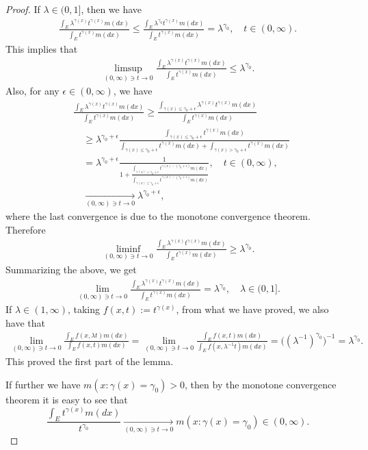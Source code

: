 \documentclass[UTF8]{pkuthss}
\theoremstyle{plain}
\theoremstyle{definition}
\numberwithin{equation}{section}
\begin{document}
\begin{proof}
	If $\lambda \in (0,1]$, then we have
\begin{align}
	\frac{\int_E \lambda^{\gamma(x)} t^{\gamma(x)} m(dx)}{\int_E t^{\gamma(x)} m(dx)}
	\leq \frac{\int_E \lambda^{\gamma_0} t^{\gamma(x)} m(dx)}{\int_E t^{\gamma(x)} m(dx)}
	= \lambda^{\gamma_0},
	\quad t\in (0,\infty).
\end{align}
	This implies that
\begin{align}
	\limsup_{(0,\infty) \ni t\to 0}\frac{\int_E \lambda^{\gamma(x)} t^{\gamma(x)} m(dx)}{\int_E t^{\gamma(x)} m(dx)}	
	\leq \lambda ^{\gamma_0}.
\end{align}
	Also, for any $\epsilon \in (0,\infty)$, we have
\begin{align}
	&\frac{\int_E \lambda^{\gamma(x)} t^{\gamma(x)} m(dx)}{\int_E t^{\gamma(x)} m(dx)}
	\geq \frac{ \int_{ \gamma(x) \leq  \gamma_0 + \epsilon } \lambda^{ \gamma(x) } t^{ \gamma(x)} m(dx) } { \int_E t^{ \gamma(x) } m(dx) }
	\\&\quad \geq \lambda^{ \gamma_0 + \epsilon} \frac{ \int_{ \gamma(x) \leq \gamma_0 + \epsilon } t^{ \gamma(x)} m(dx) } { \int_{ \gamma(x) \leq \gamma_0 + \epsilon}t^{\gamma(x)}m(dx)+ \int_{\gamma(x) > \gamma_0 + \epsilon} t^{\gamma(x)}m(dx)}
	\\&\quad = \lambda^{\gamma_0 + \epsilon} \frac{1}{1+ \frac{\int_{\gamma(x) > \gamma_0 + \epsilon}t^{\gamma(x) - (\gamma_0 + \epsilon)}m(dx)}{\int_{\gamma(x) \leq \gamma_0 + \epsilon}t^{\gamma(x)- (\gamma_0 + \epsilon)}m(dx)}},
	\quad t\in (0, \infty),
	\\&\quad \xrightarrow[(0,\infty) \ni t\to 0]{}
	\lambda ^{\gamma_0 + \epsilon},
\end{align}
	where the last convergence is due to the monotone convergence theorem.
	Therefore
\begin{align}
	\liminf_{(0,\infty) \ni t\to 0}\frac{\int_E \lambda^{\gamma(x)} t^{\gamma(x)} m(dx)}{\int_E t^{\gamma(x)} m(dx)}
	\geq \lambda ^{\gamma_0}.
\end{align}
	Summarizing the above,  we get
\begin{align}
	\lim_{(0,\infty) \ni t\to 0}\frac{\int_E \lambda^{\gamma(x)} t^{\gamma(x)} m(dx)}{\int_E t^{\gamma(x)} m(dx)}
	= \lambda ^{\gamma_0},	
	\quad \lambda \in (0,1].
\end{align}
	If $\lambda \in (1,\infty)$, taking $f(x, t):= t^{\gamma(x)}$, from what we have proved, we also have that
\begin{align}
	\lim_{(0,\infty)\ni t\to 0}\frac{\int_E f(x,\lambda t)m(dx)}{\int_E f(x, t)m(dx)}
	= \lim_{(0,\infty)\ni t\to 0}\frac{\int_E f(x,t)m(dx)}{\int_E f(x, \lambda^{-1} t)m(dx)}
	= \big((\lambda^{-1})^{\gamma_0} \big)^{-1}
	= \lambda ^{\gamma_0}.
\end{align}
	This proved the first part of the lemma.
	
	If further 
	we have $m(x:\gamma(x) = \gamma_0)>0$,
	then by the monotone convergence theorem  it is easy to see that
\begin{equation}
	\frac{\int_E t^{\gamma(x)} m(dx)}{t^{\gamma_0}}
	\xrightarrow[(0,\infty)\ni t\to 0]{} m(x:\gamma(x) = \gamma_0)\in (0,\infty).
\end{equation}
\end{proof}
\end{document}
